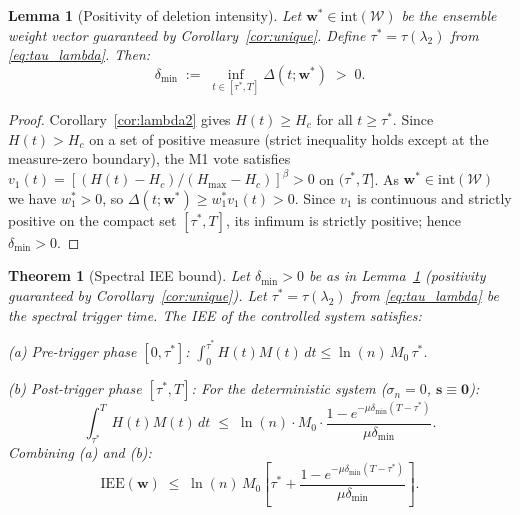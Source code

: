\documentclass[review,12pt]{elsarticle}
\newcommand{\bfw}{\mathbf{w}}
\newcommand{\IEE}{\mathrm{IEE}}
\newcommand{\Hc}{H_c}
\newcommand{\Hmax}{H_{\max}}
\newcommand{\lambdat}{\lambda_2}
\newtheorem{theorem}{Theorem}
\newtheorem{lemma}{Lemma}
\begin{document}
\begin{lemma}[Positivity of deletion intensity]
\label{lem:delta_pos}
Let $\bfw^* \in \mathrm{int}(\mathcal{W})$ be the ensemble weight vector
guaranteed by Corollary~\ref{cor:unique}.  Define
$\tau^* = \tau(\lambdat)$ from \eqref{eq:tau_lambda}.  Then:
\begin{equation}
  \delta_{\min} \;:=\; \inf_{t \in [\tau^*, T]} \Delta(t;\bfw^*) \;>\; 0.
  \label{eq:delta_min}
\end{equation}
\end{lemma}

\begin{proof}
Corollary~\ref{cor:lambda2} gives $H(t) \geq \Hc$ for all $t \geq \tau^*$.
Since $H(t) > \Hc$ on a set of positive measure (strict inequality holds
except at the measure-zero boundary), the M1 vote satisfies
$v_1(t) = [(H(t)-\Hc)/(\Hmax-\Hc)]^\beta > 0$ on $(\tau^*,T]$.
As $\bfw^* \in \mathrm{int}(\mathcal{W})$ we have $w_1^* > 0$, so
$\Delta(t;\bfw^*) \geq w_1^* v_1(t) > 0$.
Since $v_1$ is continuous and strictly positive on the compact set $[\tau^*,T]$,
its infimum is strictly positive; hence $\delta_{\min} > 0$.
\end{proof}

\begin{theorem}[Spectral IEE bound]
\label{thm:iee_bound}
Let $\delta_{\min} > 0$ be as in Lemma~\ref{lem:delta_pos}
(positivity guaranteed by Corollary~\ref{cor:unique}).
Let $\tau^* = \tau(\lambdat)$ from \eqref{eq:tau_lambda} be the spectral
trigger time.  The IEE of the controlled system satisfies:
\medskip

\noindent\emph{(a) Pre-trigger phase $[0, \tau^*]$:}
$\displaystyle\int_0^{\tau^*} H(t)M(t)\,dt \leq \ln(n)\,M_0\,\tau^*$.

\noindent\emph{(b) Post-trigger phase $[\tau^*, T]$:} For the deterministic
system ($\sigma_n=0$, $\mathbf{s}\equiv\mathbf{0}$):
\begin{equation}
  \int_{\tau^*}^T H(t)M(t)\,dt \;\leq\;
  \ln(n)\cdot M_0 \cdot
  \frac{1 - e^{-\mu\delta_{\min}(T-\tau^*)}}{\mu\delta_{\min}}.
  \label{eq:iee_bound}
\end{equation}
Combining (a) and (b):
\begin{equation}
  \IEE(\bfw) \;\leq\; \ln(n)\,M_0\!\left[
    \tau^* + \frac{1-e^{-\mu\delta_{\min}(T-\tau^*)}}{\mu\delta_{\min}}
  \right].
  \label{eq:iee_total}
\end{equation}
\end{theorem}
\end{document}
